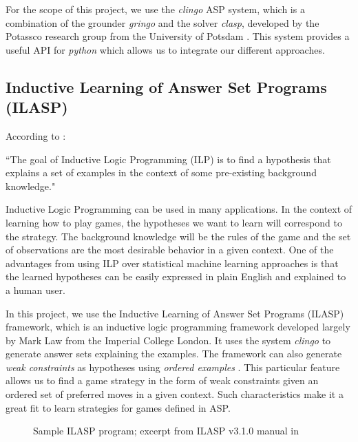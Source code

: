 For the scope of this project, we use the \textit{clingo} ASP system, which is a combination of the grounder \textit{gringo} and the solver \textit{clasp}, developed by the Potassco research group from the University of Potsdam \citep{gebser2014clingo}. This system provides a useful API for \textit{python} which allows us to integrate our different approaches. 



\subsection{Inductive Learning of Answer Set Programs (ILASP)}

According to \citet{ILASP_system}:

\begin{displayquote}
``The goal of Inductive Logic Programming (ILP) is to find a hypothesis that explains a set of examples in the context of some pre-existing background knowledge."
\end{displayquote}

\justify


Inductive Logic Programming can be used in many applications. In the context of learning how to play games, the hypotheses we want to learn will correspond to the strategy. The background knowledge will be the rules of the game and the set of observations are the most desirable behavior in a given context. One of the advantages from using ILP over statistical machine learning approaches is that the learned hypotheses can be easily expressed in plain English and explained to a human user.

In this project, we use the Inductive Learning of Answer Set Programs (ILASP) framework, which is an inductive logic programming framework developed largely by Mark Law from the Imperial College London. It uses the system \textit{clingo} to generate answer sets explaining the examples. The framework can also generate \textit{weak constraints} as hypotheses using \textit{ordered examples} \citep{ILASP_system}. This particular feature allows us to find a game strategy in the form of weak constraints given an ordered set of preferred moves in a given context. Such characteristics make it a great fit to learn strategies for games defined in ASP.


\begin{figure}[H]
\centering
{}
\caption{Sample ILASP program; excerpt from ILASP v3.1.0 manual in \citet{law2017inductive}} 
\end{figure}

